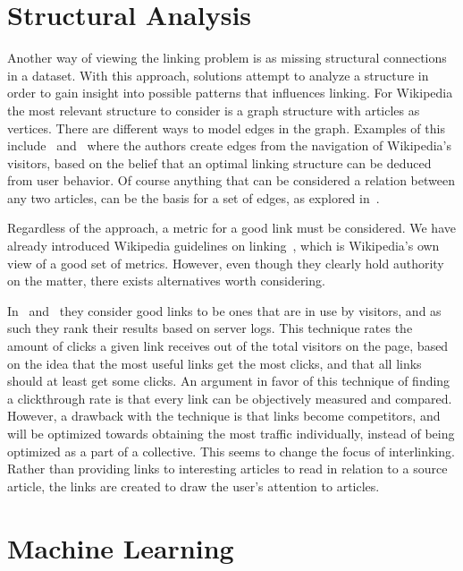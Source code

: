 \section{Structural Analysis}\label{related_structural_analysis}

Another way of viewing the linking problem is as missing structural connections in a dataset. With this approach, solutions attempt to analyze a structure in order to gain insight into possible patterns that influences linking. For Wikipedia the most relevant structure to consider is a graph structure with articles as vertices. There are different ways to model edges in the graph. Examples of this include~\cite{hyperlink-structure-using-logs} and~\cite{west2015mining} where the authors create edges from the navigation of Wikipedia's visitors, based on the belief that an optimal linking structure can be deduced from user behavior. Of course anything that can be considered a relation between any two articles, can be the basis for a set of edges, as explored in~\cite{lu2011link}.

Regardless of the approach, a metric for a good link must be considered. We have already introduced Wikipedia guidelines on linking~\cite{wiki-editor-guidelines}, which is Wikipedia's own view of a good set of metrics. However, even though they clearly hold authority on the matter, there exists alternatives worth considering.

In~\cite{hyperlink-structure-using-logs} and~\cite{west2015mining} they consider good links to be ones that are in use by visitors, and as such they rank their results based on server logs. This technique rates the amount of clicks a given link receives out of the total visitors on the page, based on the idea that the most useful links get the most clicks, and that all links should at least get some clicks. An argument in favor of this technique of finding a clickthrough rate is that every link can be objectively measured and compared. However, a drawback with the technique is that links become competitors, and will be optimized towards obtaining the most traffic individually, instead of being optimized as a part of a collective. This seems to change the focus of interlinking. Rather than providing links to interesting articles to read in relation to a source article, the links are created to draw the user's attention to articles.

\section{Machine Learning}\label{related_machine_learning}

